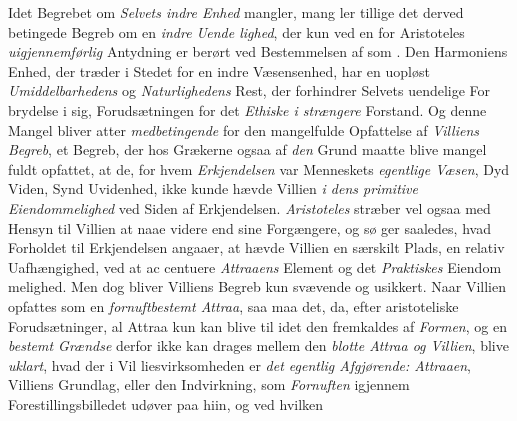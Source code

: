 Idet Begrebet om \emph{Selvets indre Enhed} mangler, mang\-%
ler tillige det derved betingede Begreb om en \emph{indre Uende\-%
lighed}, der kun ved en for Aristoteles \emph{uigjennemførlig}
Antydning er berørt ved Bestemmelsen af \emph{} som \emph{}. Den Harmoniens Enhed, der træder i Stedet for en
indre Væsensenhed, har en uopløst \emph{Umiddelbarhedens} og
\emph{Naturlighedens} Rest, der forhindrer Selvets uendelige For\-%
brydelse i sig, Forudsætningen for det \emph{Ethiske i strængere}
 Forstand. Og denne Mangel bliver atter \emph{medbetingende}
for den mangelfulde Opfattelse af \emph{Villiens Begreb}, et Begreb,
der hos Grækerne ogsaa af \emph{den} Grund maatte blive mangel\-%
fuldt opfattet, at de, for hvem \emph{Erkjendelsen} var Menneskets
\emph{egentlige Væsen}, Dyd Viden, Synd Uvidenhed, ikke kunde
hævde Villien \emph{i dens primitive Eiendommelighed} ved
Siden af Erkjendelsen. \emph{Aristoteles} stræber vel ogsaa med
Hensyn til Villien at naae videre end sine Forgængere, og sø\-%
ger saaledes, hvad Forholdet til Erkjendelsen angaaer, at hævde
Villien en særskilt Plads, en relativ Uafhængighed, ved at ac\-%
centuere \emph{Attraaens} Element og det \emph{Praktiskes} Eiendom\-%
melighed. Men dog bliver Villiens Begreb kun svævende og
usikkert. Naar Villien opfattes som en \emph{fornuftbestemt
Attraa}, saa maa det, da, efter aristoteliske Forudsætninger,
al Attraa kun kan blive til idet den fremkaldes af \emph{Formen},
og en \emph{bestemt Grændse} derfor ikke kan drages mellem den
\emph{blotte Attraa og Villien}, blive \emph{uklart}, hvad der i Vil\-%
liesvirksomheden er \emph{det egentlig Afgjørende: Attraaen},
Villiens Grundlag, eller den Indvirkning, som \emph{Fornuften}
igjennem Forestillingsbilledet udøver paa hiin, og ved hvilken

